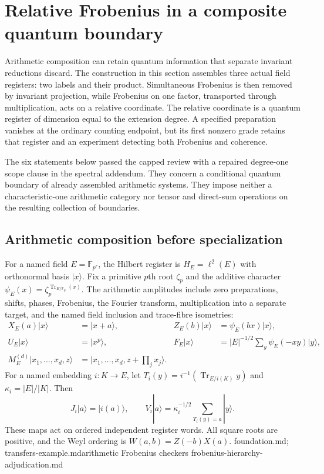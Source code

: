 \section{Relative Frobenius in a composite quantum boundary}
\label{sec:composite-relative-boundary}

Arithmetic composition can retain quantum information that separate
invariant reductions discard. The construction in this section assembles
three actual field registers: two labels and their product. Simultaneous
Frobenius is then removed by invariant projection, while Frobenius on one
factor, transported through multiplication, acts on a relative coordinate.
The relative coordinate is a quantum register of dimension equal to the
extension degree. A specified preparation vanishes at the ordinary
counting endpoint, but its first nonzero grade retains that register and
an experiment detecting both Frobenius and coherence.

The six statements below passed the capped review with a repaired
degree-one scope clause in the spectral addendum. They
concern a conditional quantum boundary of already assembled arithmetic
systems. They impose neither a characteristic-one arithmetic category nor
tensor and direct-sum operations on the resulting collection of boundaries.

\subsection{Arithmetic composition before specialization}

For a named field $E=\mathbb F_{p^r}$, the Hilbert register is
$H_E=\ell^2(E)$ with orthonormal basis $|x\rangle$. Fix a primitive
$p$th root $\zeta_p$ and the additive character
$\psi_E(x)=\zeta_p^{\operatorname{Tr}_{E/\mathbb F_p}(x)}$.
The arithmetic amplitudes include zero preparations, shifts, phases,
Frobenius, the Fourier transform, multiplication into a separate target,
and the named field inclusion and trace-fibre isometries:
\begin{align*}
 X_E(a)|x\rangle&=|x+a\rangle,&
 Z_E(b)|x\rangle&=\psi_E(bx)|x\rangle,\\
 U_E|x\rangle&=|x^p\rangle,&
 F_E|x\rangle&=|E|^{-1/2}\sum_y\psi_E(-xy)|y\rangle,\\
 M_E^{(d)}|x_1,\ldots,x_d,z\rangle
 &=|x_1,\ldots,x_d,z+\prod_jx_j\rangle.
\end{align*}
For a named embedding $i:K\to E$, let
$T_i(y)=i^{-1}(\operatorname{Tr}_{E/i(K)}y)$ and
$\kappa_i=|E|/|K|$. Then
\[
 J_i|a\rangle=|i(a)\rangle,\qquad
 V_i|a\rangle=\kappa_i^{-1/2}\sum_{T_i(y)=a}|y\rangle.
\]
These maps act on ordered independent register words. All square roots
are positive, and the Weyl ordering is $W(a,b)=Z(-b)X(a)$.
{foundation.md; transfers-example.md}{arithmetic Frobenius checkers}
{frobenius-hierarchy-adjudication.md}

